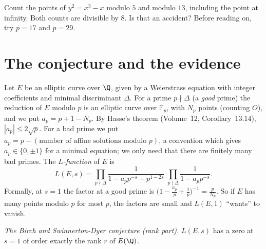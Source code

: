 \begin{think}
Count the points of $y^2=x^3-x$ modulo $5$ and modulo $13$, including the point at infinity. Both counts are divisible by $8$. Is that an accident? Before
reading on, try $p=17$ and $p=29$.
\end{think}

\section{The conjecture and the evidence}

Let $E$ be an elliptic curve over $\Q$, given by a Weierstrass equation with integer coefficients and minimal discriminant $\Delta$. For a prime $p\nmid\Delta$
(a \emph{good} prime) the reduction of $E$ modulo $p$ is an elliptic curve over $\mathbb F_p$, with $N_p$ points (counting $O$), and we put $a_p=p+1-N_p$. By
Hasse's theorem (Volume~12, Corollary~13.14), $|a_p|\le2\sqrt p$. For a bad prime we put $a_p=p-(\text{number of affine solutions modulo }p)$, a convention
which gives $a_p\in\{0,\pm1\}$ for a minimal equation; we only need that there are finitely many bad primes. The \emph{$L$-function} of $E$ is
\[
L(E,s)=\prod_{p\nmid\Delta}\frac1{1-a_pp^{-s}+p^{1-2s}}\;\prod_{p\mid\Delta}\frac1{1-a_pp^{-s}}.
\]
Formally, at $s=1$ the factor at a good prime is $\bigl(1-\frac{a_p}p+\frac1p\bigr)^{-1}=\frac p{N_p}$. So if $E$ has many points modulo $p$ for most $p$, the
factors are small and $L(E,1)$ ``wants'' to vanish.

\begin{center}
\emph{The Birch and Swinnerton-Dyer conjecture (rank part).} $L(E,s)$ has a zero at $s=1$ of order exactly the rank $r$ of $E(\Q)$.
\end{center}

